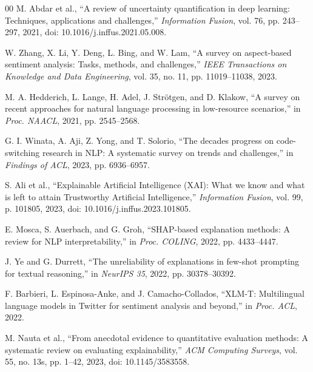\documentclass[conference]{IEEEtran}
\begin{document}
\begin{thebibliography}{00}
 M. Abdar et al., ``A review of uncertainty quantification in deep learning: Techniques, applications and challenges,'' \textit{Information Fusion}, vol. 76, pp. 243--297, 2021, doi: 10.1016/j.inffus.2021.05.008.

 W. Zhang, X. Li, Y. Deng, L. Bing, and W. Lam, ``A survey on aspect-based sentiment analysis: Tasks, methods, and challenges,'' \textit{IEEE Transactions on Knowledge and Data Engineering}, vol. 35, no. 11, pp. 11019--11038, 2023.

 M. A. Hedderich, L. Lange, H. Adel, J. Strötgen, and D. Klakow, ``A survey on recent approaches for natural language processing in low-resource scenarios,'' in \textit{Proc. NAACL}, 2021, pp. 2545--2568.

 G. I. Winata, A. Aji, Z. Yong, and T. Solorio, ``The decades progress on code-switching research in NLP: A systematic survey on trends and challenges,'' in \textit{Findings of ACL}, 2023, pp. 6936--6957.

 S. Ali et al., ``Explainable Artificial Intelligence (XAI): What we know and what is left to attain Trustworthy Artificial Intelligence,'' \textit{Information Fusion}, vol. 99, p. 101805, 2023, doi: 10.1016/j.inffus.2023.101805.

 E. Mosca, S. Auerbach, and G. Groh, ``SHAP-based explanation methods: A review for NLP interpretability,'' in \textit{Proc. COLING}, 2022, pp. 4433--4447.

 J. Ye and G. Durrett, ``The unreliability of explanations in few-shot prompting for textual reasoning,'' in \textit{NeurIPS 35}, 2022, pp. 30378--30392.

 F. Barbieri, L. Espinosa-Anke, and J. Camacho-Collados, ``XLM-T: Multilingual language models in Twitter for sentiment analysis and beyond,'' in \textit{Proc. ACL}, 2022.

 M. Nauta et al., ``From anecdotal evidence to quantitative evaluation methods: A systematic review on evaluating explainability,'' \textit{ACM Computing Surveys}, vol. 55, no. 13s, pp. 1--42, 2023, doi: 10.1145/3583558.

\end{thebibliography}
\end{document}
